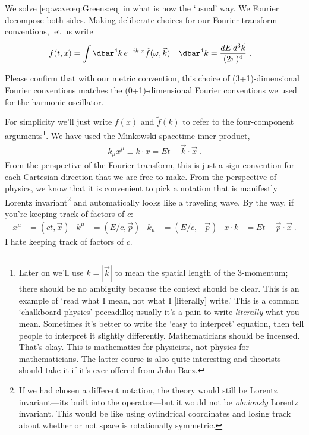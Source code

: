 We solve \eqref{eq:wave:eq:Greens:eq} in what is now the `usual' way. We Fourier decompose both sides. Making deliberate choices for our Fourier transform conventions, let us write
\begin{align}
  f(t,\vec{x}) &= \int \dbar^4k \, e^{-ik\cdot x} \tilde f(\omega, \vec{k})
  &
  \dbar^4k &= \frac{dE\, d^3\vec{k}}{(2\pi)^4}
   \ .
\end{align}
\begin{exercise}
Please confirm that with our metric convention, this choice of (3+1)-dimensional Fourier conventions matches the (0+1)-dimensional Fourier conventions we used for the harmonic oscillator.
\end{exercise}
For simplicity we'll just write $f(x)$ and $\tilde f(k)$ to refer to the four-component arguments\footnote{Later on we'll use $k=|\vec{k}|$ to mean the spatial length of the 3-momentum; there should be no ambiguity because the context should be clear. This is an example of `read what I mean, not what I [literally] write.' This is a common `chalkboard physics' peccadillo; usually it's a pain to write \emph{literally} what you mean. Sometimes it's better to write the `easy to interpret' equation, then tell people to interpret it slightly differently. Mathematicians should be incensed. That's okay. This is mathematics for physicists, not physics for mathematicians. The latter course is also quite interesting and theorists should take it if it's ever offered from John Baez.}. 
We have used the Minkowski spacetime inner product,
\begin{align}
  k_\mu x^\mu \equiv k\cdot x = Et - \vec{k}\cdot\vec{x} \ .
\end{align}
From the perspective of the Fourier transform, this is just a sign convention for each Cartesian direction that we are free to make. From the perspective of physics, we know that it is convenient to pick a notation that is manifestly Lorentz invariant\footnote{If we had chosen a different notation, the theory would still be Lorentz invariant---its built into the operator---but it would not be \emph{obviously} Lorentz invariant. This would be like using cylindrical coordinates and losing track about whether or not space is rotationally symmetric.} and automatically looks like a traveling wave. By the way, if you're keeping track of factors of $c$:
\begin{align}
  x^\mu &= (ct,\vec{x})
  &
  k^\mu &= (E/c,\vec{p})
  &
  k_\mu &= (E/c, -\vec{p})
  &
  x\cdot k  &= Et - \vec{p}\cdot\vec{x} \ .
\end{align}
I hate keeping track of factors of $c$. 


